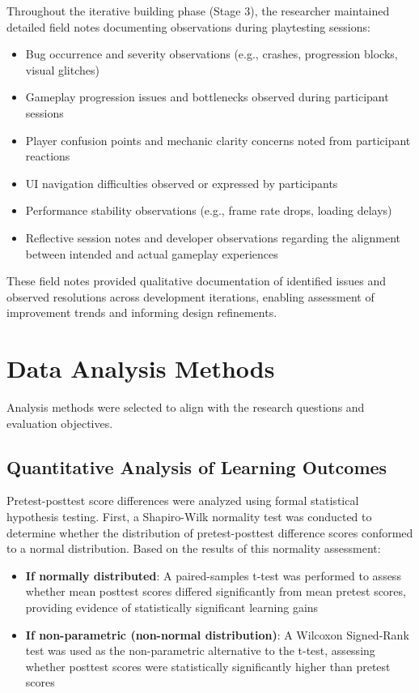 Throughout the iterative building phase (Stage 3), the researcher maintained detailed field notes documenting observations during playtesting sessions:

\begin{itemize}
    \item Bug occurrence and severity observations (e.g., crashes, progression blocks, visual glitches)
    \item Gameplay progression issues and bottlenecks observed during participant sessions
    \item Player confusion points and mechanic clarity concerns noted from participant reactions
    \item UI navigation difficulties observed or expressed by participants
    \item Performance stability observations (e.g., frame rate drops, loading delays)
    \item Reflective session notes and developer observations regarding the alignment between intended and actual gameplay experiences
\end{itemize}

These field notes provided qualitative documentation of identified issues and observed resolutions across development iterations, enabling assessment of improvement trends and informing design refinements.

\section{Data Analysis Methods}

Analysis methods were selected to align with the research questions and evaluation objectives.

\subsection{Quantitative Analysis of Learning Outcomes}

Pretest-posttest score differences were analyzed using formal statistical hypothesis testing. First, a Shapiro-Wilk normality test was conducted to determine whether the distribution of pretest-posttest difference scores conformed to a normal distribution. Based on the results of this normality assessment:

\begin{itemize}
    \item \textbf{If normally distributed}: A paired-samples t-test was performed to assess whether mean posttest scores differed significantly from mean pretest scores, providing evidence of statistically significant learning gains
    \item \textbf{If non-parametric (non-normal distribution)}: A Wilcoxon Signed-Rank test was used as the non-parametric alternative to the t-test, assessing whether posttest scores were statistically significantly higher than pretest scores
\end{itemize}

